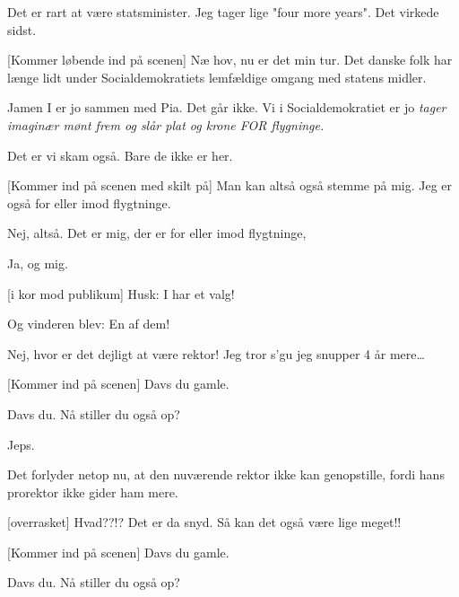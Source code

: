 \documentclass[a4paper,11pt]{article}
\begin{document}
\begin{sketch}
  
   Det er rart at være statsminister. Jeg tager lige "four
  more years". Det virkede sidst.
  
   [Kommer løbende ind på scenen] Næ hov, nu er det min tur.
  Det danske folk har længe lidt under Socialdemokratiets lemfældige
  omgang med statens midler.
  
   Jamen I er jo sammen med Pia. Det går ikke. Vi i
  Socialdemokratiet er jo \em{tager imaginær mønt frem og slår plat og
    krone} FOR flygninge.
  
   Det er vi skam også. Bare de ikke er her.
  
   [Kommer ind på scenen med skilt på] Man kan altså også
  stemme på mig. Jeg er også for eller imod flygtninge.
  
   Nej, altså. Det er mig, der er for eller imod flygtninge,

   Ja, og mig.
  
  
   [i kor mod publikum] Husk: I har et valg!
  
   Og vinderen blev: En af dem!
  
  
   Nej, hvor er det dejligt at være rektor! Jeg tror s'gu jeg
  snupper 4 år mere\ldots
  
   [Kommer ind på scenen] Davs du gamle.
  
   Davs du. Nå stiller du også op?
  
   Jeps.
  
   Det forlyder netop nu, at den nuværende rektor ikke kan
  genopstille, fordi hans prorektor ikke gider ham mere.
  
   [overrasket] Hvad??!? Det er da snyd.  Så
  kan det også være lige meget!!
  
  
   [Kommer ind på scenen] Davs du gamle.
  
   Davs du. Nå stiller du også op?


\end{sketch}
\end{document}
